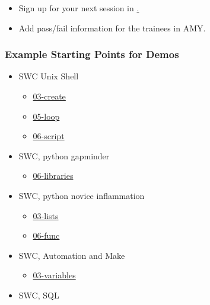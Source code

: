 \begin{itemize}
\itemsep1pt\parskip0pt
\item
  Sign up for your next session in
  \href{http://pad.software-carpentry.org/teaching-demos}.
\item
  Add pass/fail information for the trainees in AMY.
\end{itemize}

\subsubsection{Example Starting Points for
Demos}\label{example-starting-points-for-demos}

\begin{itemize}
\itemsep1pt\parskip0pt
\item
  SWC Unix Shell

  \begin{itemize}
  \itemsep1pt\parskip0pt
  \item
    \href{\{\{\%20site.swc\_pages\%20\}\}/shell-novice/03-create/}{03-create}
  \item
    \href{\{\{\%20site.swc\_pages\%20\}\}/shell-novice/05-loop/}{05-loop}
  \item
    \href{\{\{\%20site.swc\_pages\%20\}\}/shell-novice/06-script/}{06-script}
  \end{itemize}
\item
  SWC, python gapminder

  \begin{itemize}
  \itemsep1pt\parskip0pt
  \item
    \href{\{\{\%20site.swc\_pages\%20\}\}/python-novice-gapminder/06-libraries/}{06-libraries}
  \end{itemize}
\item
  SWC, python novice inflammation

  \begin{itemize}
  \itemsep1pt\parskip0pt
  \item
    \href{\{\{\%20site.swc\_pages\%20\}\}/python-novice-inflammation/03-lists/}{03-lists}
  \item
    \href{\{\{\%20site.swc\_pages\%20\}\}/python-novice-inflammation/06-func/}{06-func}
  \end{itemize}
\item
  SWC, Automation and Make

  \begin{itemize}
  \itemsep1pt\parskip0pt
  \item
    \href{\{\{\%20site.swc\_pages\%20\}\}/make-novice/03-variables/}{03-variables}
  \end{itemize}
\item
  SWC, SQL


\end{itemize}
